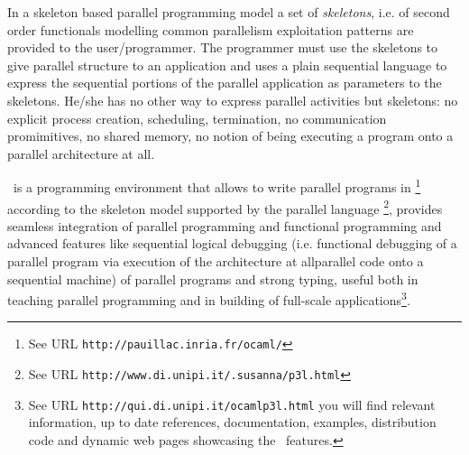 In a skeleton based parallel programming model 
\cite{cole-th,ic-parle-93-1,fgcs-firenze} a set of \textit{skeletons},
i.e. of second order functionals modelling common parallelism
exploitation patterns are provided to the user/programmer. The
programmer must use the skeletons to give parallel structure to
an application and  uses a plain sequential language to
express the sequential portions of the parallel application as
parameters to the skeletons. He/she has no other way to express
parallel activities but skeletons: no explicit process creation,
scheduling, termination, no communication promimitives, no shared
memory, no notion of being executing a program onto a parallel
architecture at all.

\ocamlpiiil\ is a programming environment that allows to write parallel
programs in \ocaml\footnote{See URL
  \texttt{http://pauillac.inria.fr/ocaml/}} according to the skeleton
model supported by the parallel language \pppl\footnote{See URL
  \texttt{http://www.di.unipi.it/.susanna/p3l.html}}, provides
seamless integration of parallel programming and functional
programming and advanced features like sequential logical debugging
(i.e. functional debugging of a parallel program via execution of the
architecture at allparallel code onto a
sequential machine) of parallel programs and strong typing, useful
both in teaching parallel programming and in building of
full-scale applications\footnote{See URL
  \texttt{http://qui.di.unipi.it/ocamlp3l.html} you will find relevant
  information, up to date references, documentation, examples,
  distribution code and dynamic web pages showcasing the \ocamlpiiil\
  features.}.

